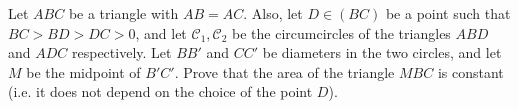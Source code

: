 Let $ABC$ be a triangle with $AB=AC$.
Also, let $D \in (BC)$ be a point such that $BC > BD > DC > 0$, and let $\mathcal{C}_1,\mathcal{C}_2$ be the circumcircles of the triangles $ABD$ and $ADC$ respectively.
Let $BB'$ and $CC'$ be diameters in the two circles, and let $M$ be the midpoint of $B'C'$.
Prove that the area of the triangle $MBC$ is constant (i.e. it does not depend on the choice of the point $D$).
